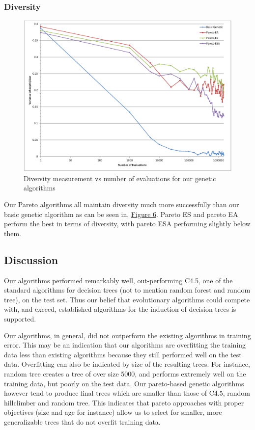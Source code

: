 \documentclass{acm_proc_article-sp}
\begin{document}
\subsubsection{Diversity}

\begin{figure}[h]
\centering
\includegraphics[width=\linewidth]{diversity_chart.eps}
\caption{Diversity measurement vs number of evaluations for our genetic algorithms}\label{diversity}
\end{figure}

Our Pareto algorithms all maintain diversity much more successfully than our basic genetic algorithm as can be seen in, \hyperref[diversity]{Figure 6}. Pareto ES and pareto EA perform the best in terms of diversity, with pareto ESA performing slightly below them.

\subsection{Discussion}

Our algorithms performed remarkably well, out-performing C4.5, one of the standard algorithms for decision trees (not to mention random forest and random tree), on the test set. Thus our belief that evolutionary algorithms could compete with, and exceed, established algorithms for the induction of decision trees is supported.

Our algorithms, in general, did not outperform the existing algorithms in training error. This may be an indication that our algorithms are overfitting the training data less than existing algorithms because they still performed well on the test data. Overfitting can also be indicated by size of the resulting trees. For instance, random tree creates a tree of over size 5000, and performs extremely well on the training data, but poorly on the test data. Our pareto-based genetic algorithms however tend to produce final trees which are smaller than those of C4.5, random hillclimber and random tree. This indicates that pareto approaches with proper objectives (size and age for instance) allow us to select for smaller, more generalizable trees that do not overfit training data.
\end{document}
